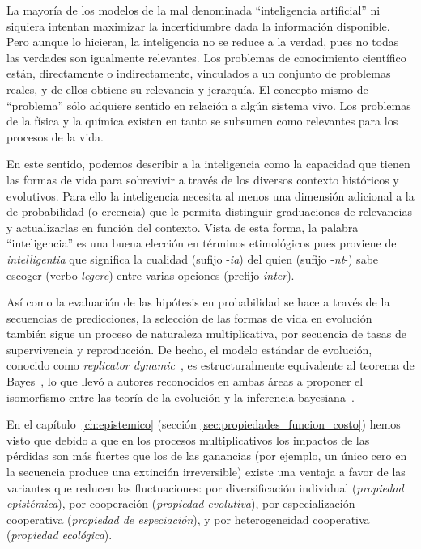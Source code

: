 \documentclass[a4paper,11pt]{book}
\theoremstyle{definition}
\begin{document}

La mayor\'ia de los modelos de la mal denominada ``inteligencia artificial'' ni siquiera intentan maximizar la incertidumbre dada la informaci\'on disponible.
%
Pero aunque lo hicieran, la inteligencia no se reduce a la verdad, pues no todas las verdades son igualmente relevantes.
%
Los problemas de conocimiento cient\'ifico est\'an, directamente o indirectamente, vinculados a un conjunto de problemas reales, y de ellos obtiene su relevancia y jerarqu\'ia.
%
El concepto mismo de ``problema'' s\'olo adquiere sentido en relaci\'on a alg\'un sistema vivo.
%
Los problemas de la f\'isica y la qu\'imica existen en tanto se subsumen como relevantes para los procesos de la vida.


En este sentido, podemos describir a la inteligencia como la capacidad que tienen las formas de vida para sobrevivir a trav\'es de los diversos contexto hist\'oricos y evolutivos.
%
Para ello la inteligencia necesita al menos una dimensi\'on adicional a la de probabilidad (o creencia) que le permita distinguir graduaciones de relevancias y actualizarlas en funci\'on del contexto.
%
Vista de esta forma, la palabra ``inteligencia'' es una buena elecci\'on en t\'erminos etimol\'ogicos pues proviene de \emph{intelligentia} que significa la cualidad (sufijo -\emph{ia}) del quien (sufijo -\emph{nt}-) sabe escoger (verbo \emph{legere}) entre varias opciones (prefijo \emph{inter}).


As\'i como la evaluaci\'on de las hip\'otesis en probabilidad se hace a trav\'es de la secuencias de predicciones, la selecci\'on de las formas de vida en evoluci\'on tambi\'en sigue un proceso de naturaleza multiplicativa, por secuencia de tasas de supervivencia y reproducci\'on.
%
De hecho, el modelo est\'andar de evoluci\'on, conocido como \emph{replicator dynamic}~\cite{taylor1978-replicatorDynamic}, es estructuralmente equivalente al teorema de Bayes~\cite{harper2009-replicatorAsInference,shalizi2009-replicatorAsInference}, lo que llev\'o a autores reconocidos en ambas \'areas a proponer el isomorfismo entre las teor\'ia de la evoluci\'on y la inferencia bayesiana~\cite{czegel2019-bayesianEvolution,czegel2022-bayesDarwin}.


En el cap\'itulo~\ref{ch:epistemico} (secci\'on \ref{sec:propiedades_funcion_costo}) hemos visto que debido a que en los procesos multiplicativos los impactos de las p\'erdidas son m\'as fuertes que los de las ganancias (por ejemplo, un \'unico cero en la secuencia produce una extinci\'on irreversible) existe una ventaja a favor de las variantes que reducen las fluctuaciones: por diversificaci\'on individual (\emph{propiedad epist\'emica}), por cooperaci\'on (\emph{propiedad evolutiva}), por especializaci\'on cooperativa (\emph{propiedad de especiaci\'on}), y por heterogeneidad cooperativa (\emph{propiedad ecol\'ogica}).
\end{document}
